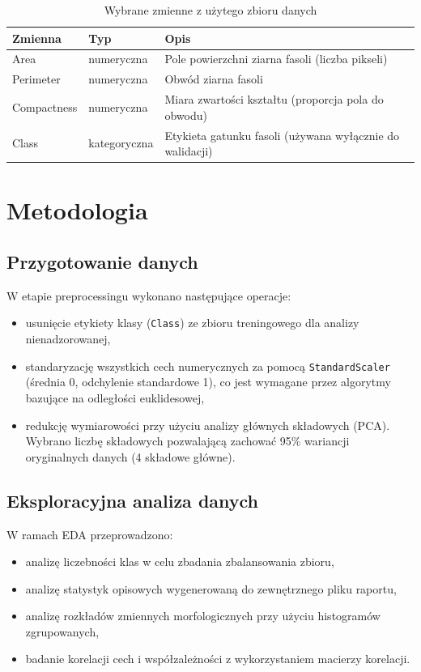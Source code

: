\documentclass[11pt,a4paper]{article}
\begin{document}
\begin{table}[H]
\centering
\caption{Wybrane zmienne z użytego zbioru danych}
\begin{tabular}{lll}
\toprule
\textbf{Zmienna} & \textbf{Typ} & \textbf{Opis} \\
\midrule
Area & numeryczna & Pole powierzchni ziarna fasoli (liczba pikseli) \\
Perimeter & numeryczna & Obwód ziarna fasoli \\
Compactness & numeryczna & Miara zwartości kształtu (proporcja pola do obwodu) \\
Class & kategoryczna & Etykieta gatunku fasoli (używana wyłącznie do walidacji) \\
\bottomrule
\end{tabular}
\end{table}

\section{Metodologia}

\subsection{Przygotowanie danych}

W etapie preprocessingu wykonano następujące operacje:
\begin{itemize}[leftmargin=1.5cm]
    \item usunięcie etykiety klasy (\texttt{Class}) ze zbioru treningowego dla analizy nienadzorowanej,
    \item standaryzację wszystkich cech numerycznych za pomocą \texttt{StandardScaler} (średnia 0, odchylenie standardowe 1), co jest wymagane przez algorytmy bazujące na odległości euklidesowej,
    \item redukcję wymiarowości przy użyciu analizy głównych składowych (PCA). Wybrano liczbę składowych pozwalającą zachować 95\% wariancji oryginalnych danych (4 składowe główne).
\end{itemize}

\subsection{Eksploracyjna analiza danych}

W ramach EDA przeprowadzono:
\begin{itemize}[leftmargin=1.5cm]
    \item analizę liczebności klas w celu zbadania zbalansowania zbioru,
    \item analizę statystyk opisowych wygenerowaną do zewnętrznego pliku raportu,
    \item analizę rozkładów zmiennych morfologicznych przy użyciu histogramów zgrupowanych,
    \item badanie korelacji cech i współzależności z wykorzystaniem macierzy korelacji.
\end{itemize}
\end{document}
